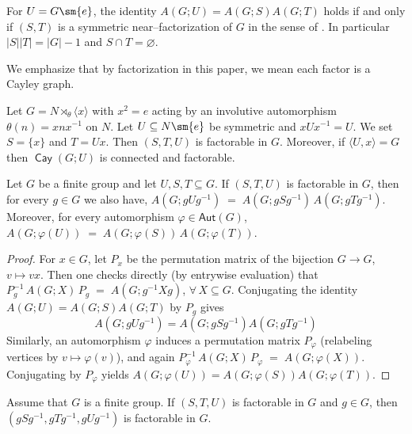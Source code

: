 \documentclass{file}
\newcommand{\cay}{\mathop{\mathsf{Cay}}}
\newcommand{\Aut}{\mathsf{Aut}}
\begin{document}
\begin{cor}
For $U=G\sm\{e\}$, the identity $A(G;U)=A(G;S)A(G;T)$ holds if and only if $(S,T)$ is a symmetric near–factorization of $G$ in the sense of \cite{decaen}.
In particular $|S||T|=|G|-1$ and
$S\cap T=\varnothing$.
\end{cor}




We emphasize that by factorization in this paper, we mean each factor is a Cayley graph.


\begin{exa}
Let $G=N\rtimes_{\theta}\langle x\rangle$ with $x^2=e$ acting by an involutive automorphism $\theta(n)=xnx^{-1}$ on $N$. Let $U\subseteq N\sm\{e\}$ be symmetric and  $xUx^{-1}=U$. 
We set $S=\{x\}$ and $T=Ux$. 
Then $(S,T,U)$ is factorable in $G$.
Moreover, if $\langle U,x\rangle=G$ then $\cay(G;U)$ is connected and factorable.
\end{exa}



\begin{lem}\label{prop:stability}
Let $G$ be a finite group and let $U,S,T\subseteq G$.
If $(S,T,U)$ is factorable in $G$, then for every $g\in G$ we also have,
$A(G;gUg^{-1}) \;=\; A(G;gSg^{-1})\,A(G;gTg^{-1})$.
Moreover, for every automorphism $\varphi\in \Aut(G)$,
$A(G;\varphi(U)) \;=\; A(G;\varphi(S))\,A(G;\varphi(T))$.
\end{lem}

\begin{proof}
For $x\in G$, let $P_x$ be the permutation matrix of the bijection
$G\to G$, $v\mapsto vx$. Then one checks directly (by entrywise
evaluation) that $P_g^{-1}\,A(G;X)\,P_g \;=\; A(G;g^{-1}Xg)$, $\forall\,X\subseteq G$.
Conjugating the identity $A(G;U)=A(G;S)A(G;T)$ by $P_g$ gives
$$A(G;gUg^{-1})=A(G;gSg^{-1})A(G;gTg^{-1})$$
Similarly, an automorphism $\varphi$ induces a permutation matrix $P_\varphi$
(relabeling vertices by $v\mapsto \varphi(v)$), and again
$P_\varphi^{-1}\,A(G;X)\,P_\varphi \;=\; A(G;\varphi(X))$.
Conjugating by $P_\varphi$ yields
$A(G;\varphi(U))=A(G;\varphi(S))A(G;\varphi(T))$.
\end{proof}

\begin{cor}
Assume that $G$ is a finite group.
If $(S,T,U)$ is factorable in $G$ and $g \in G$, then $(gSg^{-1}, gTg^{-1}, gUg^{-1})$ is factorable in $G$.
\end{cor}
\end{document}
